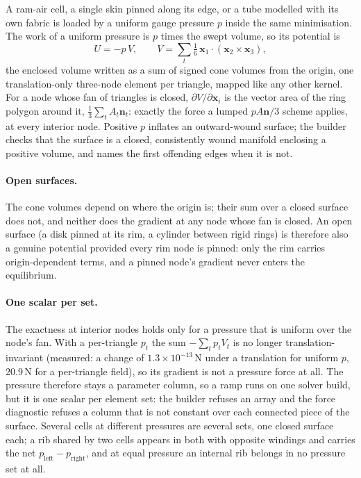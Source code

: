\documentclass[11pt,a4paper]{article}
\begin{document}
A ram-air cell, a single skin pinned along its edge, or a tube modelled with
its own fabric is loaded by a uniform gauge pressure $p$ inside the same
minimisation. The work of a uniform pressure is $p$ times the swept volume, so
its potential is
\begin{equation}
  U = -p\,V, \qquad
  V = \sum_t \tfrac{1}{6}\,\mathbf{x}_1\cdot(\mathbf{x}_2\times\mathbf{x}_3),
\end{equation}
the enclosed volume written as a sum of signed cone volumes from the origin,
one translation-only three-node element per triangle, mapped like any other
kernel. For a node whose fan of triangles is closed, $\partial V/\partial
\mathbf{x}_i$ is the vector area of the ring polygon around it,
$\tfrac{1}{3}\sum_t A_t\mathbf{n}_t$: exactly the force a lumped
$pA\mathbf{n}/3$ scheme applies, at every interior node. Positive $p$ inflates
an outward-wound surface; the builder checks that the surface is a closed,
consistently wound manifold enclosing a positive volume, and names the first
offending edges when it is not.

\paragraph{Open surfaces.} The cone volumes depend on where the origin is;
their sum over a closed surface does not, and neither does the gradient at any
node whose fan is closed. An open surface (a disk pinned at its rim, a cylinder
between rigid rings) is therefore also a genuine potential provided every rim
node is pinned: only the rim carries origin-dependent terms, and a pinned
node's gradient never enters the equilibrium.

\paragraph{One scalar per set.} The exactness at interior nodes holds only for
a pressure that is uniform over the node's fan. With a per-triangle $p_t$ the
sum $-\sum_t p_t V_t$ is no longer translation-invariant (measured: a change
of $1.3\times10^{-13}$\,N under a translation for uniform $p$, $20.9$\,N for a
per-triangle field), so its gradient is not a pressure force at all. The
pressure therefore stays a parameter column, so a ramp runs on one solver
build, but it is one scalar per element set: the builder refuses an array and
the force diagnostic refuses a column that is not constant over each connected
piece of the surface. Several cells at different pressures are several sets,
one closed surface each; a rib shared by two cells appears in both with
opposite windings and carries the net $p_{\text{left}}-p_{\text{right}}$, and
at equal pressure an internal rib belongs in no pressure set at all.
\end{document}
